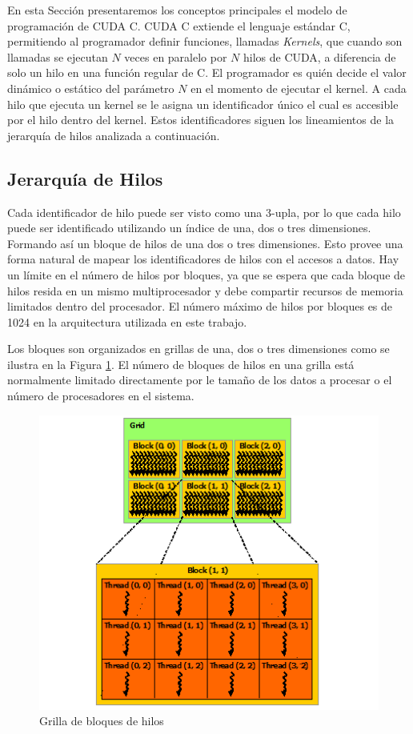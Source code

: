 \documentclass[a4paper,openright,12pt, oneside]{book}
\begin{document}
En esta Secci\'on presentaremos los conceptos principales el modelo de programaci\'on
de CUDA C. CUDA C extiende el lenguaje est\'andar C, permitiendo al programador definir
funciones, llamadas \textit{Kernels}, que cuando son llamadas se ejecutan $N$ veces
en paralelo por $N$ hilos de CUDA, a diferencia de solo un hilo en una funci\'on regular
de C. El programador es qui\'en decide el valor din\'amico o est\'atico del par\'ametro $N$
en el momento de ejecutar el kernel. A cada hilo que ejecuta un kernel se le asigna
un identificador \'unico el cual es accesible por el hilo dentro del kernel. Estos identificadores
siguen los lineamientos de la jerarqu\'ia de hilos analizada a continuaci\'on.

\subsection*{Jerarqu\'ia de Hilos}

Cada identificador de hilo puede ser visto como una 3-upla, por lo que cada hilo
puede ser identificado utilizando un \'indice de una, dos o tres dimensiones. Formando as\'i
un bloque de hilos de una dos o tres dimensiones. Esto provee una forma natural de
mapear los identificadores de hilos con el accesos a datos. Hay un l\'imite en el 
n\'umero de hilos por bloques, ya que se espera que cada bloque de hilos resida en 
un mismo multiprocesador y debe compartir recursos de memoria limitados dentro
del procesador. El n\'umero m\'aximo de hilos por bloques es de 1024 en la arquitectura
utilizada en este trabajo.

Los bloques son organizados en grillas de una, dos o tres dimensiones como se ilustra
en la Figura \ref{CUDA2}. El n\'umero de bloques de hilos en una grilla est\'a normalmente
limitado directamente por le tama\~no de los datos a procesar o el n\'umero de procesadores
en el sistema.

\begin{figure}[!htbp]
  \begin{center}
    \leavevmode

    \includegraphics[]{grid-of-thread-blocks.png}

    \caption{Grilla de bloques de hilos}
    \label{CUDA2}
  \end{center}
\end{figure}
\end{document}
